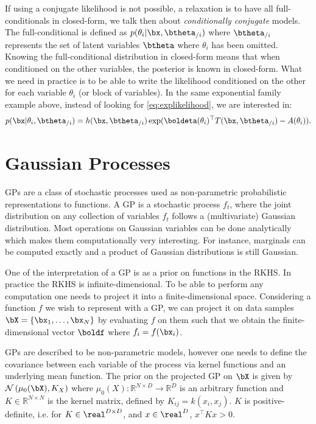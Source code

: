 If using a conjugate likelihood is not possible, a relaxation is to have all full-conditionals in closed-form, we talk then about \textit{conditionally conjugate} models.
The full-conditional is defined as $p(\theta_i|\bx, \btheta_{/i})$ where $\btheta_{/i}$ represents the set of latent variables $\btheta$ where $\theta_i$ has been omitted.
Knowing the full-conditional distribution in closed-form means that when conditioned on the other variables, the posterior is known in closed-form.
What we need in practice is to be able to write the likelihood conditioned on the other  for each variable $\theta_i$ (or block of variables).
In the same exponential family example above, instead of looking for \eqref{eq:explikelihood}, we are interested in:
\begin{align*}
    p(\bx|\theta_i, \btheta_{/i}) = h(\bx, \btheta_{/i})\exp(\boldeta(\theta_i)^\top T(\bx, \btheta_{/i}) - A(\theta_i)).
\end{align*}

\section{Gaussian Processes}
\label{sec:gps}
\acf{GPs} are a class of stochastic processes used as non-parametric probabilistic representations to functions.
A \ac{GP} is a stochastic process $f_t$, where the joint distribution on any collection of variables $f_t$ follows a (multivariate) Gaussian distribution.
Most operations on Gaussian variables can be done analytically which makes them computationally very interesting.
For instance, marginals can be computed exactly and a product of Gaussian distributions is still Gaussian.

One of the interpretation of a \ac{GP} is as a prior on functions in the \acf{RKHS}.
In practice the \ac{RKHS} is infinite-dimensional.
To be able to perform any computation one needs to project it into a finite-dimensional space.
Considering a function $f$ we wish to represent with a \ac{GP}, we can project it on data samples $\bX = \{\bx_1, \ldots, \bx_N\}$ by evaluating $f$ on them such that we obtain the finite-dimensional vector $\boldf$ where $f_i = f(\bx_i)$.

\ac{GPs} are described to be non-parametric models, however one needs to define the covariance between each variable of the process via kernel functions \needcite and an underlying mean function.
The prior on the projected \ac{GP} on $\bX$ is given by $\mathcal{N}\left(\mu_0(\bX), K_{X}\right)$ where $\mu_0(X):\mathbb{R}^{N\times D}\rightarrow \mathbb{R}^D$ is an arbitrary function and $K \in \mathbb{R}^{N\times N}$ is the kernel matrix, defined by $K_{ij} = k(x_i, x_j)$.
$K$ is positive-definite, i.e. for $K\in \real^{D\times D}$, and $x\in \real^D$, $x^\top K x > 0$.

